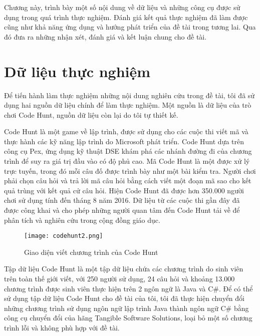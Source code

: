 Chương này,  trình bày một số nội dung về dữ liệu và những công cụ được sử dụng trong quá trình thực nghiệm. Đánh giá kết quả thực nghiệm đã làm được cũng như khả năng ứng dụng và hướng phát triển của đề tài trong tương lai. Qua đó đưa ra những nhận xét, đánh giá và kết luận chung cho đề tài.

\section{Dữ liệu thực nghiệm}
Để tiến hành làm thực nghiệm những nội dung nghiên cứu trong đề tài, tôi đã sử dụng hai nguồn dữ liệu chính để làm thực nghiệm. Một nguồn là dữ liệu của trò chơi Code Hunt, nguồn dữ liệu còn lại do tôi tự thiết kế.

Code Hunt \cite{CodeHunt} là một game về lập trình, được sử dụng cho các cuộc thi viết mã và thực hành các kỹ năng lập trình do Microsoft phát triển. Code Hunt dựa trên công cụ Pex, ứng dụng kỹ thuật DSE khám phá các nhánh đường đi của chương trình để suy ra giá trị đầu vào có độ phủ cao. Mã Code Hunt là một được xử lý trực tuyến, trong đó mỗi câu đố được trình bày như một bài kiểm tra. Người chơi phải chọn câu hỏi và trả lời mã câu hỏi bằng cách viết một đoạn mã sao cho kết quả trùng với kết quả cử câu hỏi. Hiện Code Hunt đã được hơn 350.000 người chơi sử dụng tính đến tháng 8 năm 2016. Dữ liệu từ các cuộc thi gần đây đã được công khai và cho phép những người quan tâm đến Code Hunt tải về để phân tích và nghiên cứu trong cộng đồng giáo dục.

\label{sec:data}
\begin{center}
	\begin{figure}[h]
		\begin{center}
			\texttt{[image: codehunt2.png]}
		\end{center}
		\caption{Giao diện viết chương trình của Code Hunt}
		\label{refhinh1}
	\end{figure}
\end{center}

Tập dữ liệu Code Hunt là một tập dữ liệu chứa các chương trình do sinh viên trên toàn thế giới viết, với 250 người sử dụng, 24 câu hỏi và khoảng 13.000 chương trình được sinh viên thực hiện trên 2 ngôn ngữ là Java và C\#. Để có thể sử dụng tập dữ liệu Code Hunt cho đề tài của tôi, tôi đã thực hiện chuyển đổi những chương trình sử dụng ngôn ngữ lập trình Java thành ngôn ngữ C\# bằng công cụ chuyển đổi của hãng Tangible Software Solutions, loại bỏ một số chương trình lỗi và không phù hợp với đề tài.

